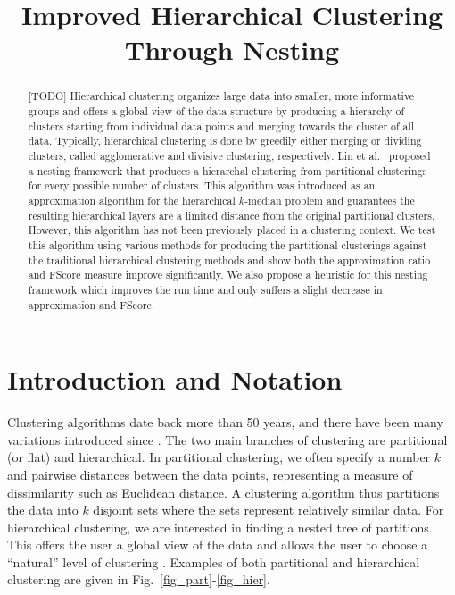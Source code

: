 \documentclass[conference, 10pt, final]{IEEEtran}
\begin{document}
 

\title{Improved Hierarchical Clustering Through Nesting}


\author{
}


\maketitle

\begin{abstract}
[TODO]
Hierarchical clustering organizes large data into smaller, more informative groups and offers a global view of the data structure by producing a hierarchy of clusters starting from individual data points and merging towards the cluster of all data. Typically, hierarchical clustering is done by greedily either merging or dividing clusters, called agglomerative and divisive clustering, respectively. Lin et al.~\cite{Lin} proposed a nesting framework that produces a hierarchal clustering from partitional clusterings for every possible number of clusters. This algorithm was introduced as an approximation algorithm for the hierarchical $k$-median problem and guarantees the resulting hierarchical layers are a limited distance from the original partitional clusters. However, this algorithm has not been previously placed in a clustering context. We test this algorithm using various methods for producing the partitional clusterings against the traditional hierarchical clustering methods and show both the approximation ratio and FScore measure improve significantly. We also propose a heuristic for this nesting framework which improves the run time and only suffers a slight decrease in approximation and FScore.
\end{abstract}


\section{Introduction and Notation}
Clustering algorithms date back more than 50 years, and there have been many variations introduced since \cite{Jain}.  The two main branches of clustering are partitional (or flat) and hierarchical. In partitional clustering, we often specify a number $k$ and pairwise distances between the data points, representing a measure of dissimilarity such as Euclidean distance. A clustering algorithm thus partitions the data into $k$ disjoint sets where the sets represent relatively similar data. For hierarchical clustering, we are interested in finding a nested tree of partitions. This offers the user a global view of the data and allows the user to choose a ``natural'' level of clustering \cite{ESL}.  Examples of both partitional and hierarchical clustering are given in Fig.~\ref{fig_part}-\ref{fig_hier}.
\end{document}
